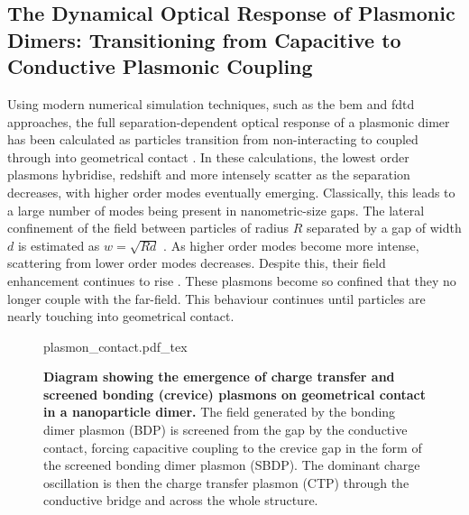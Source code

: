 \documentclass{article}
\begin{document}
\FloatBarrier
\subsection{The Dynamical Optical Response of Plasmonic Dimers: Transitioning from Capacitive to Conductive Plasmonic Coupling}

Using modern numerical simulation techniques, such as the \gls{bem} and \gls{fdtd} approaches, the full separation-dependent optical response of a plasmonic dimer has been calculated as particles transition from non-interacting to coupled through into geometrical contact \cite{romero2006}. In these calculations, the lowest order plasmons hybridise, redshift and more intensely scatter as the separation decreases, with higher order modes eventually emerging. Classically, this leads to a large number of modes being present in nanometric-size gaps. The lateral confinement of the field between particles of radius $R$ separated by a gap of width $d$ is estimated as $w=\sqrt{Rd}$ \cite{romero2006}. As higher order modes become more intense, scattering from lower order modes decreases. Despite this, their field enhancement continues to rise \cite{esteban2012}. These plasmons become so confined that they no longer couple with the far-field. This behaviour continues until particles are nearly touching into geometrical contact. %

\begin{figure}[bt]
\centering
\fontsize{10pt}{1em}\selectfont
\def\svgwidth{0.65\textwidth}
{plasmon_contact.pdf_tex}
\caption[Diagram showing the emergence of charge transfer and screened bonding (crevice) plasmons on geometrical contact in a nanoparticle dimer]{\textbf{Diagram showing the emergence of charge transfer and screened bonding (crevice) plasmons on geometrical contact in a nanoparticle dimer.} The field generated by the bonding dimer plasmon (BDP) is screened from the gap by the conductive contact, forcing capacitive coupling to the crevice gap in the form of the screened bonding dimer plasmon (SBDP). The dominant charge oscillation is then the charge transfer plasmon (CTP) through the conductive bridge and across the whole structure.}
\label{fig:plasmon_contact}
\end{figure}
\end{document}
